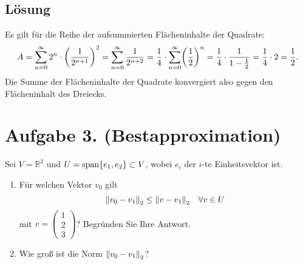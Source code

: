 \documentclass[german,12pt]{homework}
\newcommand{\RR}{\mathbb{R}}
\DeclareMathOperator{\vecspan}{span}
\DeclarePairedDelimiter{\norm}{\lVert}{\rVert}
\DeclarePairedDelimiter{\enbrace}{(}{)}
\DeclarePairedDelimiter{\penbrace}{\{}{\}}
\begin{document}
    \subsection*{Lösung} Es gilt für die Reihe der aufsummierten Flächeninhalte
    der Quadrate:
    \[A = \sum_{n = 0}^{\infty}2^n \cdot \enbrace*{\frac{1}{2^{n + 1}}}^2
    = \sum_{n = 0}^\infty\frac{1}{2^{n + 2}} = \frac{1}{4} \cdot
    \sum_{n = 0}^\infty\enbrace*{\frac{1}{2}}^n = \frac{1}{4} \cdot\frac{1}
    {1 - \frac{1}{2}} = \frac{1}{4} \cdot 2 = \frac{1}{2}.\]
    Die Summe der Flächeninhalte der Quadrate konvergiert also gegen den
    Flächeninhalt des Dreiecks.

    \section*{Aufgabe 3. (Bestapproximation)}

    \begin{problem}
        Sei \(V = \RR^3\) und \(U = \vecspan\penbrace*{e_1, e_2} \subset V\),
        wobei \(e_i\) der \(i\)-te Einheitsvektor ist.
        \begin{enumerate}
            \item Für welchen Vektor \(v_0\) gilt
            \[\norm*{v_0 - v_1}_2 \le \norm*{v - v_1}_2 \quad \forall{v \in U}\]
            mit \(v = \begin{pmatrix}1\\2\\3\end{pmatrix}\)? Begründen Sie Ihre
            Antwort.
            \item Wie groß ist die Norm \(\norm*{v_0 - v_1}_2\)?
        \end{enumerate}
    \end{problem}
\end{document}
